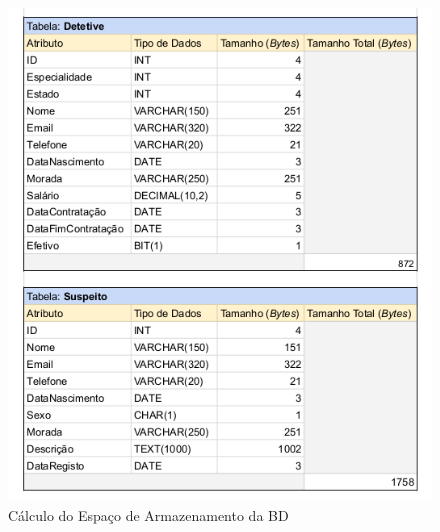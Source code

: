 \documentclass[a4paper,12pt]{scrreprt}
\begin{document}
\begin{figure}[!ht]
    \centering
    \includegraphics[scale=0.83]{images/armazenamento/3.png}
    \caption{Cálculo do Espaço de Armazenamento da BD}
    \label{fig:5.3}
\end{figure}
\end{document}
